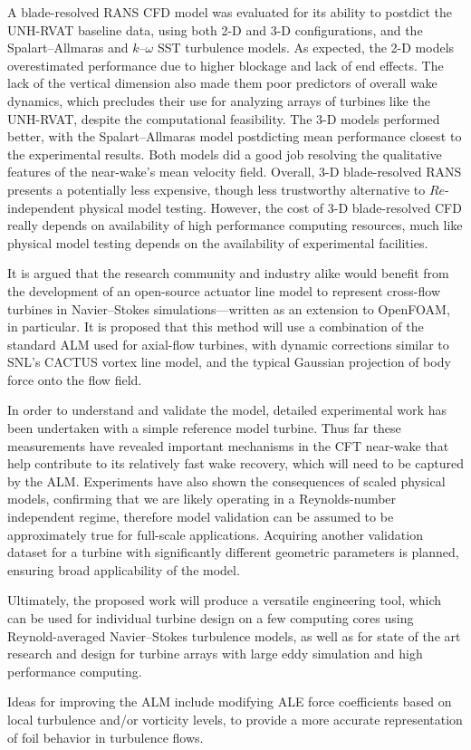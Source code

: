 A blade-resolved RANS CFD model was evaluated for its ability to postdict the
UNH-RVAT baseline data, using both 2-D and 3-D configurations, and the
Spalart--Allmaras and $k$--$\omega$ SST turbulence models. As expected, the 2-D
models overestimated performance due to higher blockage and lack of end effects.
The lack of the vertical dimension also made them poor predictors of overall
wake dynamics, which precludes their use for analyzing arrays of turbines like
the UNH-RVAT, despite the computational feasibility. The 3-D models performed
better, with the Spalart--Allmaras model postdicting mean performance closest to
the experimental results. Both models did a good job resolving the qualitative
features of the near-wake's mean velocity field. Overall, 3-D blade-resolved
RANS presents a potentially less expensive, though less trustworthy alternative
to $Re$-independent physical model testing. However, the cost of 3-D
blade-resolved CFD really depends on availability of high performance computing
resources, much like physical model testing depends on the availability of
experimental facilities.

It is argued that the research community and industry alike would benefit from
the development of an open-source actuator line model to represent cross-flow
turbines in Navier--Stokes simulations---written as an extension to OpenFOAM, in
particular. It is proposed that this method will use a combination of the
standard ALM used for axial-flow turbines, with dynamic corrections similar to
SNL's CACTUS vortex line model, and the typical Gaussian projection of body
force onto the flow field.

In order to understand and validate the model, detailed experimental work has
been undertaken with a simple reference model turbine. Thus far these
measurements have revealed important mechanisms in the CFT near-wake that help
contribute to its relatively fast wake recovery, which will need to be captured
by the ALM. Experiments have also shown the consequences of scaled physical
models, confirming that we are likely operating in a Reynolds-number independent
regime, therefore model validation can be assumed to be approximately true for
full-scale applications. Acquiring another validation dataset for a turbine
with significantly different geometric parameters is planned, ensuring broad
applicability of the model.

Ultimately, the proposed work will produce a versatile engineering tool, which
can be used for individual turbine design on a few computing cores using
Reynold-averaged Navier--Stokes turbulence models, as well as for state of the
art research and design for turbine arrays with large eddy simulation and high
performance computing.

Ideas for improving the ALM include modifying ALE force coefficients based on
local turbulence and/or vorticity levels, to provide a more accurate
representation of foil behavior in turbulence flows.